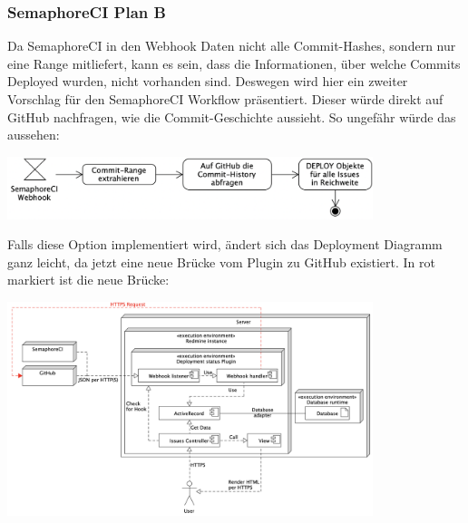\subsubsection{SemaphoreCI Plan B}
Da SemaphoreCI in den Webhook Daten nicht alle Commit-Hashes, sondern nur eine Range mitliefert, kann es sein, dass die
Informationen, über welche Commits Deployed wurden, nicht vorhanden sind. Deswegen wird hier ein zweiter Vorschlag für den
SemaphoreCI Workflow präsentiert. Dieser würde direkt auf GitHub nachfragen, wie die Commit-Geschichte aussieht. So
ungefähr würde das aussehen: \newline
\begin{center}
  \includegraphics[width=0.8\textwidth]{images/activity/semaphore-backup-hooks.png}
  \label{fig:activity_plan_b}
  \newline
\end{center}
Falls diese Option implementiert wird, ändert sich das Deployment Diagramm ganz leicht, da jetzt
eine neue Brücke vom Plugin zu GitHub existiert. In rot markiert ist die neue Brücke: \newline
\begin{center}
  \includegraphics[width=0.8\textwidth]{images/deployment/backup-hooks.png}
  \label{fig:activity_plan_b_deployment}
\end{center}

